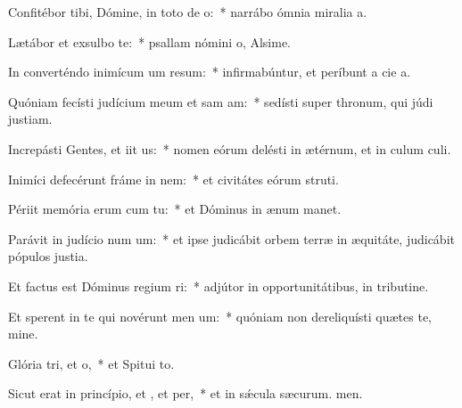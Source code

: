 \item Confitébor tibi, Dómine, in toto de o:~* narrábo ómnia miralia a.
\item Lætábor et exsulbo  te:~* psallam nómini o, Alsime.
\item In converténdo inimícum um resum:~* infirmabúntur, et períbunt a cie a.
\item Quóniam fecísti judícium meum et sam am:~* sedísti super thronum, qui júdi justiam.
\item Increpásti Gentes, et iit us:~* nomen eórum delésti in ætérnum, et in culum culi.
\item Inimíci defecérunt fráme in nem:~* et civitátes eórum struti.
\item Périit memória erum cum tu:~* et Dóminus in ænum manet.
\item Parávit in judício num um:~* et ipse judicábit orbem terræ in æquitáte, judicábit pópulos  justia.
\item Et factus est Dóminus regium ri:~* adjútor in opportunitátibus, in tributine.
\item Et sperent in te qui novérunt men um:~* quóniam non dereliquísti quætes te, mine.
\item Glória tri, et o,~* et Spitui to.
\item Sicut erat in princípio, et , et per,~* et in sǽcula sæcurum. men.
